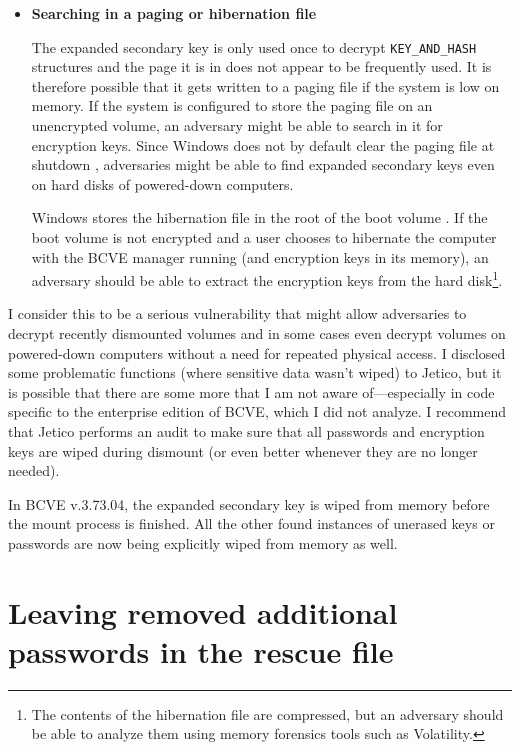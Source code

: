 \documentclass[thesis=B,english]{FITthesis}[2012/10/20]
\begin{document}
\begin{itemize}
		\item \textbf{Searching in a paging or hibernation file}
		
		The expanded secondary key is only used once to decrypt \verb|KEY_AND_HASH| structures and the page it is in does not appear to be frequently used. It is therefore possible that it gets written to a paging file if the system is low on memory. If the system is configured to store the paging file on an unencrypted volume, an adversary might be able to search in it for encryption keys. Since Windows does not by default clear the paging file at shutdown \cite{pagingfile}, adversaries might be able to find expanded secondary keys even on hard disks of powered-down computers. 
		
		Windows stores the hibernation file in the root of the boot volume \cite{russinovich}. If the boot volume is not encrypted and a user chooses to hibernate the computer with the BCVE manager running (and encryption keys in its memory), an adversary should be able to extract the encryption keys from the hard disk\footnote{The contents of the hibernation file are compressed, but an adversary should be able to analyze them using memory forensics tools such as Volatility.}. 
		
	\end{itemize}
	
	I consider this to be a serious vulnerability that might allow adversaries to decrypt recently dismounted volumes and in some cases even decrypt volumes on powered-down computers without a need for repeated physical access. I disclosed some problematic functions (where sensitive data wasn't wiped) to Jetico, but it is possible that there are some more that I am not aware of---especially in code specific to the enterprise edition of BCVE, which I did not analyze. I recommend that Jetico performs an audit to make sure that all passwords and encryption keys are wiped during dismount (or even better whenever they are no longer needed).
	
	In BCVE v.3.73.04, the expanded secondary key is wiped from memory before the mount process is finished. All the other found instances of unerased keys or passwords are now being explicitly wiped from memory as well.
	
	\section{Leaving removed additional passwords in the rescue file}
	
\end{document}
